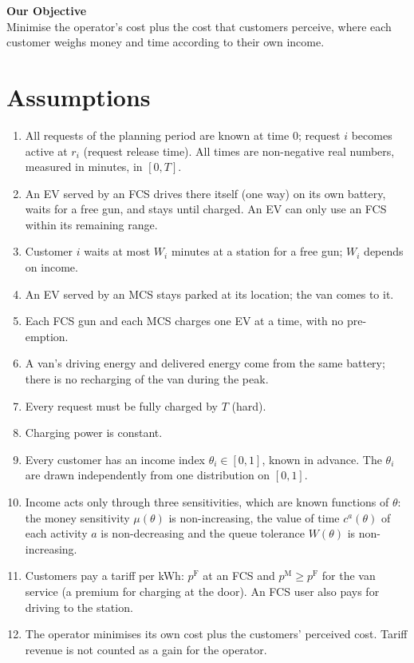 \documentclass[12pt,a4paper]{article}
\begin{document}
\begin{objbox}
{\color{headblue}\textbf{Our Objective}}\\
Minimise the operator's cost plus the cost that customers perceive, where each customer weighs money and time according to their own income.
\end{objbox}

\section{Assumptions}
\begin{enumerate}[itemsep=2pt]
  \item All requests of the planning period are known at time 0; request $i$ becomes active at $r_i$ (request release time). All times are non-negative real numbers, measured in minutes, in $[0,T]$.
  \item An EV served by an FCS drives there itself (one way) on its own battery, waits for a free gun, and stays until charged. An EV can only use an FCS within its remaining range.
  \item Customer $i$ waits at most $W_i$ minutes at a station for a free gun; $W_i$ depends on income.
  \item An EV served by an MCS stays parked at its location; the van comes to it.
  \item Each FCS gun and each MCS charges one EV at a time, with no pre-emption.
  \item A van's driving energy and delivered energy come from the same battery; there is no recharging of the van during the peak.
  \item Every request must be fully charged by $T$ (hard).
  \item Charging power is constant.
  \item Every customer has an income index $\theta_i\in[0,1]$, known in advance. The $\theta_i$ are drawn independently from one distribution on $[0,1]$.
  \item Income acts only through three sensitivities, which are known functions of $\theta$: the money sensitivity $\mu(\theta)$ is non-increasing, the value of time $c^{a}(\theta)$ of each activity $a$ is non-decreasing and the queue tolerance $W(\theta)$ is non-increasing.
  \item Customers pay a tariff per kWh: $p^{\mathrm F}$ at an FCS and $p^{\mathrm M}\ge p^{\mathrm F}$ for the van service (a premium for charging at the door). An FCS user also pays for driving to the station.
  \item The operator minimises its own cost plus the customers' perceived cost. Tariff revenue is not counted as a gain for the operator.
\end{enumerate}
\end{document}

